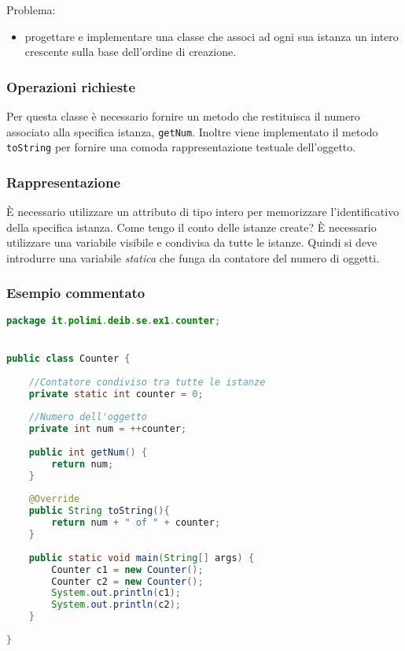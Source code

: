 \documentclass{article}
\begin{document}
Problema:

\begin{itemize}
	\item  progettare e implementare una classe che associ ad ogni sua istanza un intero crescente sulla base dell'ordine di creazione.
\end{itemize}

\subsubsection{Operazioni richieste}

Per questa classe è necessario fornire un metodo che restituisca
il numero associato alla specifica istanza, \texttt{getNum}.
Inoltre viene implementato il metodo \texttt{toString} per fornire
una comoda rappresentazione testuale dell'oggetto.

\subsubsection{Rappresentazione}

È necessario utilizzare un attributo di tipo intero per memorizzare
l'identificativo della specifica istanza.
Come tengo il conto delle istanze create? È necessario utilizzare
una variabile visibile e condivisa da tutte le istanze.
Quindi si deve introdurre una variabile \emph{statica} che funga da contatore del numero di oggetti.

\subsubsection{Esempio commentato}
\begin{lstlisting}[language=Java,escapechar=|]
package it.polimi.deib.se.ex1.counter;


public class Counter {
	
	//Contatore condiviso tra tutte le istanze
	private static int counter = 0;
	
	//Numero dell'oggetto
	private int num = ++counter;
	
	public int getNum() {
		return num;
	}
	
	@Override
	public String toString(){
		return num + " of " + counter;
	}
	
	public static void main(String[] args) {
		Counter c1 = new Counter();
		Counter c2 = new Counter();
		System.out.println(c1);
		System.out.println(c2);
	}
	
}
\end{lstlisting}
\end{document}
